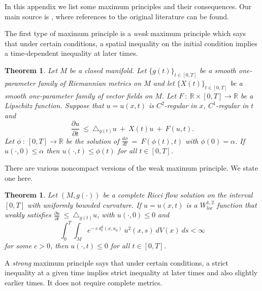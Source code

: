\documentclass[12pt]{amsart}
\newcommand{\R}{{\mathbb R}}
\numberwithin{equation}{section}
\theoremstyle{plain}
\newtheorem{theorem}[equation]{Theorem}
\theoremstyle{definition}
\theoremstyle{remark}
\begin{document}
In this appendix we list some maximum principles and their
consequences.  Our main source is \cite{Chow-Lu-Ni}, where
references to the original literature can be found.

The first type of maximum principle is a {\em weak} maximum
principle which says that under certain conditions, a spatial inequality
on the initial condition implies a time-dependent inequality at later times.

\begin{theorem}
Let $M$ be a closed manifold. Let $\{g(t)\}_{t \in [0,T]}$ be a smooth
one-parameter family of Riemannian metrics on $M$ and let 
$\{X(t)\}_{t \in [0, T]}$ be
a smooth one-parameter family of vector fields on $M$. Let $F \: : \:
\R \times [0, T] \rightarrow \R$ be a Lipschitz function.  Suppose that
$u=u(x,t)$ is $C^2$-regular in $x$, $C^1$-regular in $t$ and
\begin{equation}
\frac{\partial u}{\partial t} \: \le \: \triangle_{g(t)} u \: + \: X(t) u \: + \: F(u, t).
\end{equation}
Let $\phi \: : \: [0,T] \rightarrow \R$ be the solution of 
$\frac{d\phi}{dt} \: = \: F(\phi(t), t)$ with $\phi(0) = \alpha$. If
$u(\cdot, 0) \le \alpha$ then $u(\cdot, t) \le \phi(t)$ for all $t \in [0, T]$.
\end{theorem}

There are various noncompact versions of the weak maximum principle.
We state one here.

\begin{theorem}
Let $(M, g(\cdot))$ be a complete Ricci flow solution on the interval
$[0,T]$ with uniformly bounded curvature.  If $u=u(x,t)$ is a
$W^{1,2}_{loc}$ function that weakly satisfies
$\frac{\partial u}{\partial t} \: \le \: \triangle_{g(t)} u$, with
$u(\cdot, 0) \le 0$ and
\begin{equation}
\int_0^T \int_M e^{- \: c \: d_t^2(x, x_0)} \: u^2(x,s) \: dV(x) \: ds < \infty
\end{equation}
for some $c > 0$, then $u(\cdot,t) \le 0$ for all $t \in [0,T]$.
\end{theorem}

A {\em strong} maximum principle says that under certain conditions,
a strict inequality at a given time implies strict inequality at later
times and also slightly earlier times.  It does not require complete metrics.
\end{document}
